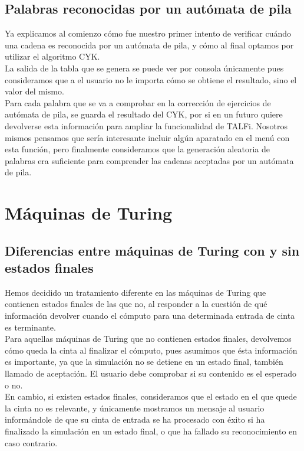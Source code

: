 \documentclass[12pt,a4paper,spanish]{book}
\begin{document}
\subsection{Palabras reconocidas por un aut\'omata de pila}
Ya explicamos al comienzo c\'omo fue nuestro primer intento de verificar cu\'ando una cadena es reconocida por un aut\'omata de pila, y c\'omo al final  optamos por utilizar el algoritmo CYK.\\
La salida de la tabla que se genera se puede ver por consola \'unicamente pues consideramos que a el usuario no le importa c\'omo se obtiene el resultado, sino el valor del mismo. \\
Para cada palabra que se va a comprobar en la correcci\'on de ejercicios de aut\'omata de pila, se guarda el resultado del CYK, por si en un futuro quiere devolverse esta informaci\'on para ampliar la funcionalidad de TALFi. Nosotros mismos pensamos que ser\'ia interesante incluir alg\'un aparatado en el men\'u con esta funci\'on, pero finalmente consideramos que la generaci\'on aleatoria de palabras era suficiente para comprender las cadenas aceptadas por un aut\'omata de pila.



\section{M\'aquinas de Turing}

\subsection{Diferencias entre m\'aquinas de Turing con y sin estados finales}
Hemos decidido un tratamiento diferente en las  m\'aquinas de Turing que contienen estados finales de las que no, al responder a la cuesti\'on de qu\'e informaci\'on devolver cuando el c\'omputo para una determinada entrada de cinta es terminante.\\
\newline
Para aquellas m\'aquinas de Turing que no contienen estados finales, devolvemos c\'omo queda la cinta al finalizar el c\'omputo, pues asumimos que \'esta informaci\'on es importante, ya que la simulaci\'on no se detiene en un estado final, tambi\'en llamado de aceptaci\'on. El usuario debe comprobar si su contenido es el esperado o no.
\\
En cambio, si existen estados finales, consideramos que el estado en el que quede la cinta no es relevante, y \'unicamente mostramos un mensaje al usuario inform\'andole de que su cinta de entrada se ha procesado con \'exito si ha finalizado la simulaci\'on en un estado final, o que ha fallado su reconocimiento en caso contrario.
\end{document}
